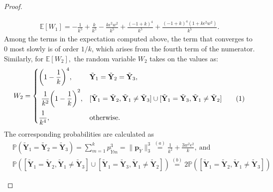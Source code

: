 \documentclass[twoside,11pt]{article}
\newcommand\numberthis{\addtocounter{equation}{1}\tag{\theequation}}
\newcommand{\rvTwo}{Y}
\newcommand{\vectorize}[1]{\mathbf{#1}}
\newcommand{\mP}{\mathbb{P}} %
\newcommand{\alphabetSize}{k} %
\newcommand{\vectorIndex}{m}
\newcommand{\probVecElement}[2]{p_{{#1}{#2}}}
\newcommand{\probVec}{\mathbf{p}} %
\begin{document}
\begin{appendix}
\begin{proof}
\begin{itemize}
			\begin{align*}
				\mathbb{E}[W_1]
				= 
				-\frac{1}{k^5}
				+
				\frac{k}{k^5}
				-
				\frac{k \epsilon^2 w^2 }{k^5}
				+
				\frac{(-1 + k)^4}{k^5}
				+
				\frac{(-1 + k)^4 (1 + k\epsilon^2  w^2)}{k^5}.
			\end{align*}
			Among the terms in the expectation computed above,
			the term that converges to 0 most slowly is of order
			$1/\alphabetSize$, which arises from the fourth term of the numerator. 
			Similarly, for
			$
			\mathbb{E}[W_2],
			$
			the random variable $W_2$ takes on the values as:
			\begin{align*}
				W_2
				=
				\begin{cases}
					\biggl(1-\dfrac{1}{\alphabetSize}\biggr)^4, & 
					\tilde{\vectorize{\rvTwo}}_1
					=
					\tilde{\vectorize{\rvTwo}}_2
					=
					\tilde{\vectorize{\rvTwo}}_3,
					\\[1em]
					~\dfrac{1}{\alphabetSize^2}
					\biggl(1-\dfrac{1}{\alphabetSize}\biggr)^2, & 
					[\tilde{\vectorize{\rvTwo}}_1 = \tilde{\vectorize{\rvTwo}}_2,
					\tilde{\vectorize{\rvTwo}}_1 \neq
					\tilde{\vectorize{\rvTwo}}_3]
					\cup
					[\tilde{\vectorize{\rvTwo}}_1 = \tilde{\vectorize{\rvTwo}}_3,
					\tilde{\vectorize{\rvTwo}}_1 \neq
					\tilde{\vectorize{\rvTwo}}_2]
					\numberthis
					\label{kernel_three_genrr}
					\\[1em]
					\dfrac{1}{\alphabetSize^4}, & \text{otherwise.}
				\end{cases}	 
			\end{align*}
			The corresponding probabilities are calculated as
			\begin{align*}
				& \mP(\tilde{\vectorize{\rvTwo}}_1
				=
				\tilde{\vectorize{\rvTwo}}_2
				=
				\tilde{\vectorize{\rvTwo}}_3)
				=
				\sum_{\vectorIndex = 1}^\alphabetSize
				\probVecElement{\tilde{\rvTwo}}{\vectorIndex}^3
				=
				\|\probVec_{\tilde{\rvTwo}}\|_3^3
				\stackrel{(a)}{=}
				\frac{1}{\alphabetSize^2}
				+
				\frac{3 w^2 \epsilon^2}{\alphabetSize},~\text{and}
				\\
				& \mP([\tilde{\vectorize{\rvTwo}}_1 = \tilde{\vectorize{\rvTwo}}_2,
				\tilde{\vectorize{\rvTwo}}_1 \neq
				\tilde{\vectorize{\rvTwo}}_3]
				\cup
				[\tilde{\vectorize{\rvTwo}}_1 = \tilde{\vectorize{\rvTwo}}_3,
				\tilde{\vectorize{\rvTwo}}_1 \neq
				\tilde{\vectorize{\rvTwo}}_2])
				\stackrel{(b)}{=}
				2
				\mP([\tilde{\vectorize{\rvTwo}}_1 = \tilde{\vectorize{\rvTwo}}_2,
				\tilde{\vectorize{\rvTwo}}_1 \neq
				\tilde{\vectorize{\rvTwo}}_3])

\end{align*}
\end{itemize}
\end{proof}
\end{appendix}
\end{document}

